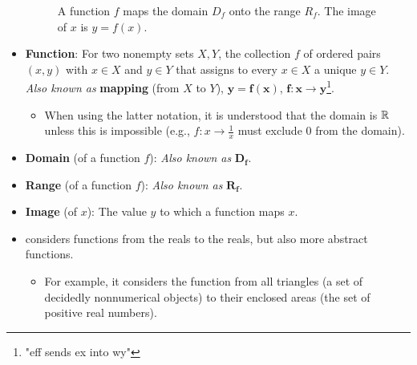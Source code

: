 \documentclass[../main.tex]{subfiles}
\begin{document}
\begin{itemize}
\begin{figure}[h!]
        \caption{A function $f$ maps the domain $D_f$ onto the range $R_f$. The image of $x$ is $y=f(x)$.}
        \label{fig:mapping}
    \end{figure}
    \item \textbf{Function}: For two nonempty sets $X,Y$, the collection $f$ of ordered pairs $(x,y)$ with $x\in X$ and $y\in Y$ that assigns to every $x\in X$ a unique $y\in Y$. \emph{Also known as} \textbf{mapping} (from $X$ to $Y$), $\bm{y=f(x)}$, $\bm{f:x\to y}$\footnote{"eff sends ex into wy"}.
    \begin{itemize}
        \item When using the latter notation, it is understood that the domain is $\mathbb{R}$ unless this is impossible (e.g., $f:x\to\frac{1}{x}$ must exclude 0 from the domain).
    \end{itemize}
    \item \textbf{Domain} (of a function $f$):  \emph{Also known as} $\bm{D_f}$.
    \item \textbf{Range} (of a function $f$):  \emph{Also known as} $\bm{R_f}$.
    \item \textbf{Image} (of $x$): The value $y$ to which a function maps $x$.
    \item \textcite{bib:Thomas} considers functions from the reals to the reals, but also more abstract functions.
    \begin{itemize}
        \item For example, it considers the function from all triangles (a set of decidedly nonnumerical objects) to their enclosed areas (the set of positive real numbers).
    \end{itemize}
    \begin{figure}[h!]
        \centering
\end{figure}
\end{itemize}
\end{document}
